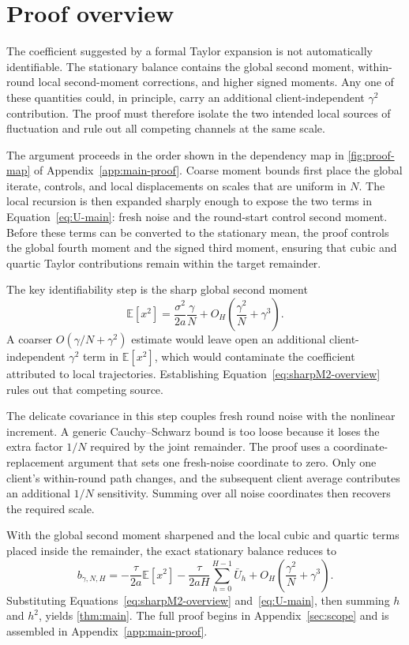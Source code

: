 \documentclass[11pt]{article}
\theoremstyle{definition}
\newcommand{\E}{\mathbb{E}}
\newcommand{\bstat}{b_{\gamma,N,H}}
\begin{document}
\section{Proof overview}
\label{sec:proof-overview}

The coefficient suggested by a formal Taylor expansion is not automatically identifiable. The stationary balance contains the global second moment, within-round local second-moment corrections, and higher signed moments. Any one of these quantities could, in principle, carry an additional client-independent $\gamma^2$ contribution. The proof must therefore isolate the two intended local sources of fluctuation and rule out all competing channels at the same scale.

The argument proceeds in the order shown in the dependency map in \cref{fig:proof-map} of Appendix~\ref{app:main-proof}. Coarse moment bounds first place the global iterate, controls, and local displacements on scales that are uniform in $N$. The local recursion is then expanded sharply enough to expose the two terms in Equation~\eqref{eq:U-main}: fresh noise and the round-start control second moment. Before these terms can be converted to the stationary mean, the proof controls the global fourth moment and the signed third moment, ensuring that cubic and quartic Taylor contributions remain within the target remainder.

The key identifiability step is the sharp global second moment
\begin{equation}
\label{eq:sharpM2-overview}
\E[x^2]=\frac{\sigma^2}{2a}\frac{\gamma}{N}
+O_H\!\left(\frac{\gamma^2}{N}+\gamma^3\right).
\end{equation}
A coarser $O(\gamma/N+\gamma^2)$ estimate would leave open an additional client-independent $\gamma^2$ term in $\E[x^2]$, which would contaminate the coefficient attributed to local trajectories. Establishing Equation~\eqref{eq:sharpM2-overview} rules out that competing source.

The delicate covariance in this step couples fresh round noise with the nonlinear increment. A generic Cauchy--Schwarz bound is too loose because it loses the extra factor $1/N$ required by the joint remainder. The proof uses a coordinate-replacement argument that sets one fresh-noise coordinate to zero. Only one client's within-round path changes, and the subsequent client average contributes an additional $1/N$ sensitivity. Summing over all noise coordinates then recovers the required scale.

With the global second moment sharpened and the local cubic and quartic terms placed inside the remainder, the exact stationary balance reduces to
\[
\bstat
=-\frac{\tau}{2a}\E[x^2]
-\frac{\tau}{2aH}\sum_{h=0}^{H-1}\bar U_h
+O_H\!\left(\frac{\gamma^2}{N}+\gamma^3\right).
\]
Substituting Equations~\eqref{eq:sharpM2-overview} and~\eqref{eq:U-main}, then summing $h$ and $h^2$, yields \cref{thm:main}. The full proof begins in Appendix~\ref{sec:scope} and is assembled in Appendix~\ref{app:main-proof}.
\end{document}
